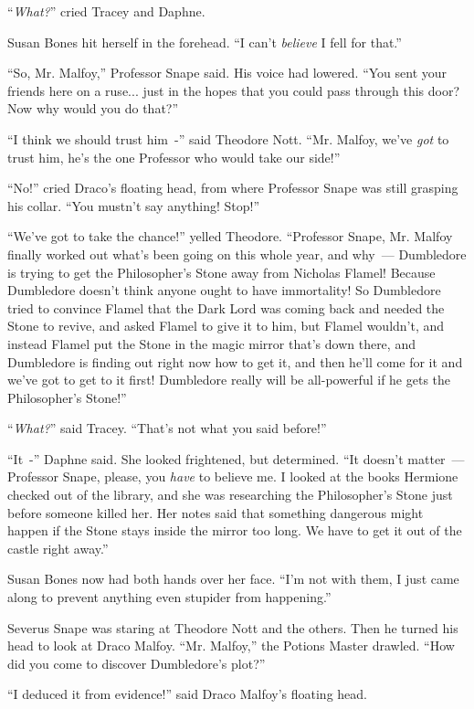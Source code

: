 ``\emph{What?}'' cried Tracey and Daphne.

Susan Bones hit herself in the forehead. ``I can't \emph{believe} I fell for that.''

``So, Mr. Malfoy,'' Professor Snape said. His voice had lowered. ``You sent your friends here on a ruse... just in the hopes that you could pass through this door? Now why would you do that?''

``I think we should trust him~-'' said Theodore Nott. ``Mr. Malfoy, we've \emph{got} to trust him, he's the one Professor who would take our side!''

``No!'' cried Draco's floating head, from where Professor Snape was still grasping his collar. ``You mustn't say anything! Stop!''

``We've got to take the chance!'' yelled Theodore. ``Professor Snape, Mr. Malfoy finally worked out what's been going on this whole year, and why~--- Dumbledore is trying to get the Philosopher's Stone away from Nicholas Flamel! Because Dumbledore doesn't think anyone ought to have immortality! So Dumbledore tried to convince Flamel that the Dark Lord was coming back and needed the Stone to revive, and asked Flamel to give it to him, but Flamel wouldn't, and instead Flamel put the Stone in the magic mirror that's down there, and Dumbledore is finding out right now how to get it, and then he'll come for it and we've got to get to it first! Dumbledore really will be all-powerful if he gets the Philosopher's Stone!''

``\emph{What?}'' said Tracey. ``That's not what you said before!''

``It~-'' Daphne said. She looked frightened, but determined. ``It doesn't matter~--- Professor Snape, please, you \emph{have} to believe me. I looked at the books Hermione checked out of the library, and she was researching the Philosopher's Stone just before someone killed her. Her notes said that something dangerous might happen if the Stone stays inside the mirror too long. We have to get it out of the castle right away.''

Susan Bones now had both hands over her face. ``I'm not with them, I just came along to prevent anything even stupider from happening.''

Severus Snape was staring at Theodore Nott and the others. Then he turned his head to look at Draco Malfoy. ``Mr. Malfoy,'' the Potions Master drawled. ``How did you come to discover Dumbledore's plot?''

``I deduced it from evidence!'' said Draco Malfoy's floating head.

